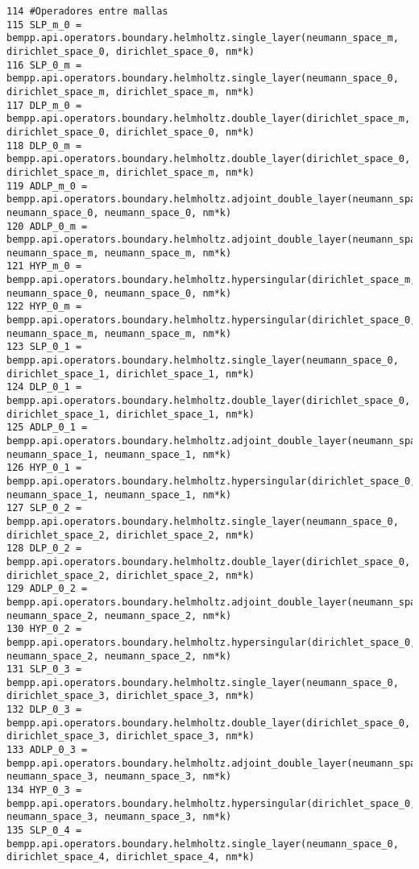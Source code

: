 \documentclass[12pt,letterpaper]{article}
\numberwithin{equation}{section}
\begin{document}
\begin{lstlisting}
114 #Operadores entre mallas
115 SLP_m_0 = bempp.api.operators.boundary.helmholtz.single_layer(neumann_space_m, dirichlet_space_0, dirichlet_space_0, nm*k)
116 SLP_0_m = bempp.api.operators.boundary.helmholtz.single_layer(neumann_space_0, dirichlet_space_m, dirichlet_space_m, nm*k)
117 DLP_m_0 = bempp.api.operators.boundary.helmholtz.double_layer(dirichlet_space_m, dirichlet_space_0, dirichlet_space_0, nm*k)
118 DLP_0_m = bempp.api.operators.boundary.helmholtz.double_layer(dirichlet_space_0, dirichlet_space_m, dirichlet_space_m, nm*k)
119 ADLP_m_0 = bempp.api.operators.boundary.helmholtz.adjoint_double_layer(neumann_space_m, neumann_space_0, neumann_space_0, nm*k)
120 ADLP_0_m = bempp.api.operators.boundary.helmholtz.adjoint_double_layer(neumann_space_0, neumann_space_m, neumann_space_m, nm*k)
121 HYP_m_0 = bempp.api.operators.boundary.helmholtz.hypersingular(dirichlet_space_m, neumann_space_0, neumann_space_0, nm*k)
122 HYP_0_m = bempp.api.operators.boundary.helmholtz.hypersingular(dirichlet_space_0, neumann_space_m, neumann_space_m, nm*k)
123 SLP_0_1 = bempp.api.operators.boundary.helmholtz.single_layer(neumann_space_0, dirichlet_space_1, dirichlet_space_1, nm*k)
124 DLP_0_1 = bempp.api.operators.boundary.helmholtz.double_layer(dirichlet_space_0, dirichlet_space_1, dirichlet_space_1, nm*k)
125 ADLP_0_1 = bempp.api.operators.boundary.helmholtz.adjoint_double_layer(neumann_space_0, neumann_space_1, neumann_space_1, nm*k)
126 HYP_0_1 = bempp.api.operators.boundary.helmholtz.hypersingular(dirichlet_space_0, neumann_space_1, neumann_space_1, nm*k)
127 SLP_0_2 = bempp.api.operators.boundary.helmholtz.single_layer(neumann_space_0, dirichlet_space_2, dirichlet_space_2, nm*k)
128 DLP_0_2 = bempp.api.operators.boundary.helmholtz.double_layer(dirichlet_space_0, dirichlet_space_2, dirichlet_space_2, nm*k)
129 ADLP_0_2 = bempp.api.operators.boundary.helmholtz.adjoint_double_layer(neumann_space_0, neumann_space_2, neumann_space_2, nm*k)
130 HYP_0_2 = bempp.api.operators.boundary.helmholtz.hypersingular(dirichlet_space_0, neumann_space_2, neumann_space_2, nm*k)
131 SLP_0_3 = bempp.api.operators.boundary.helmholtz.single_layer(neumann_space_0, dirichlet_space_3, dirichlet_space_3, nm*k)
132 DLP_0_3 = bempp.api.operators.boundary.helmholtz.double_layer(dirichlet_space_0, dirichlet_space_3, dirichlet_space_3, nm*k)
133 ADLP_0_3 = bempp.api.operators.boundary.helmholtz.adjoint_double_layer(neumann_space_0, neumann_space_3, neumann_space_3, nm*k)
134 HYP_0_3 = bempp.api.operators.boundary.helmholtz.hypersingular(dirichlet_space_0, neumann_space_3, neumann_space_3, nm*k)
135 SLP_0_4 = bempp.api.operators.boundary.helmholtz.single_layer(neumann_space_0, dirichlet_space_4, dirichlet_space_4, nm*k)

\end{lstlisting}
\end{document}

